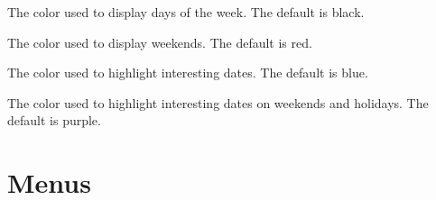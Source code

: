 \documentclass[a4paper,english]{article}
\begin{document}
\begin{Description}
        \item[Ical.weekdayColor]
            The color used to display days of the week.  The default
            is black.

        \item[Ical.weekendColor]
            The color used to display weekends.  The default is red.

        \item[Ical.interestColor]
            The color used to highlight interesting dates.  The
            default is blue.

        \item[Ical.weekendInterestColor]
            The color used to highlight interesting dates on weekends
            and holidays.  The default is purple.

        \end{Description}


\section{Menus}
\end{document}
